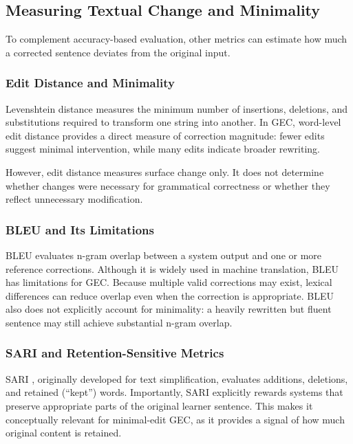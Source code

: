 \subsection{Measuring Textual Change and Minimality}

To complement accuracy-based evaluation, other metrics can estimate how much a corrected sentence deviates from the original input.

\subsubsection{Edit Distance and Minimality}

Levenshtein distance \cite{levenshtein1966binary} measures the minimum number of insertions, deletions, and substitutions required to transform one string into another. In GEC, word-level edit distance provides a direct measure of correction magnitude: fewer edits suggest minimal intervention, while many edits indicate broader rewriting.

However, edit distance measures surface change only. It does not determine whether changes were necessary for grammatical correctness or whether they reflect unnecessary modification.

\subsubsection{BLEU and Its Limitations}

BLEU \cite{papineni2002bleu} evaluates n-gram overlap between a system output and one or more reference corrections. Although it is widely used in machine translation, BLEU has limitations for GEC. Because multiple valid corrections may exist, lexical differences can reduce overlap even when the correction is appropriate. BLEU also does not explicitly account for minimality: a heavily rewritten but fluent sentence may still achieve substantial n-gram overlap.

\subsubsection{SARI and Retention-Sensitive Metrics}

SARI \cite{xu2016optimizing}, originally developed for text simplification, evaluates additions, deletions, and retained (``kept'') words. Importantly, SARI explicitly rewards systems that preserve appropriate parts of the original learner sentence. This makes it conceptually relevant for minimal-edit GEC, as it provides a signal of how much original content is retained.

